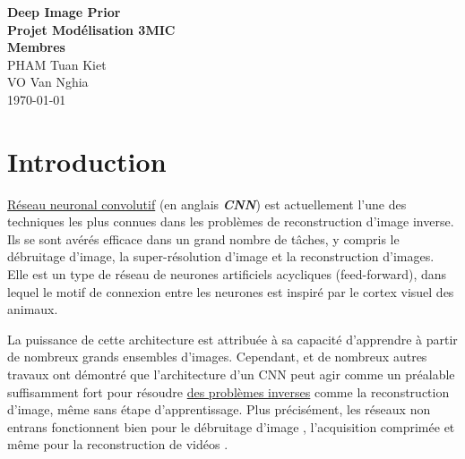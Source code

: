 \documentclass[
  11pt,
  dvipsnames]{article}
\author{}
\date{\vspace{-2.5em}}
\begin{document}
\onehalfspacing


\begin{titlepage}
\vspace*{\fill}
\begin{center}
\LARGE{\textbf{Deep Image Prior}}\\
\Large{\textbf{Projet Modélisation 3MIC}}\\
\vspace*{1\baselineskip}
\Large{\textbf{Membres}}\\
PHAM Tuan Kiet\\
VO Van Nghia\\
\vfill %
\vspace*{\fill}
\today
\end{center}
\end{titlepage}

\newpage

\newpage
{}
\tableofcontents
{}

\listoffigures

\newpage
{}

\hypertarget{introduction}{%
\section{Introduction}\label{introduction}}

\protect\hyperlink{ruxe9seau-neuronal-convolutif}{Réseau neuronal convolutif} (en anglais \textbf{\emph{CNN}}) est actuellement l'une des techniques
les plus connues dans les problèmes de reconstruction d'image inverse.
Ils se sont avérés efficace dans un grand nombre de tâches, y compris le débruitage d'image,
la super-résolution d'image et la reconstruction d'images.
Elle est un type de réseau de neurones artificiels acycliques (feed-forward),
dans lequel le motif de connexion entre les neurones est inspiré
par le cortex visuel des animaux.

La puissance de cette architecture est attribuée à sa capacité d'apprendre
à partir de nombreux grands ensembles d'images.
Cependant, \autocite{2007.02471,1711.10925} et de nombreux autres travaux ont démontré
que l'architecture d'un CNN peut agir comme un préalable suffisamment fort pour résoudre
\protect\hyperlink{les-probluxe8mes-inverses}{des problèmes inverses} comme la reconstruction d'image,
même sans étape d'apprentissage. Plus précisément, les réseaux non entrans
fonctionnent bien pour le débruitage d'image \autocite{2007.02471},
l'acquisition comprimée \autocite{1806.06438} et même pour la reconstruction de vidéos \autocite{1910.01684}.
\end{document}
